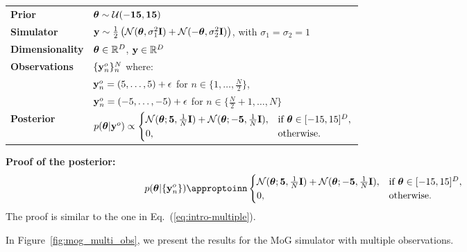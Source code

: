 \begin{tabular}{@{}ll@{}}
  \textbf{Prior} & $\boldsymbol{\theta} \sim \mathcal{U}(-\mathbf{15}, \mathbf{15})$ \\ [5pt]
  \textbf{Simulator} & $\mathbf{y} \sim \frac{1}{2} \left( \mathcal{N}(\boldsymbol{\theta}, \sigma_1^2 \mathbf{I}) + \mathcal{N}(-\boldsymbol{\theta}, \sigma_2^2 \mathbf{I}) \right)$, with $\sigma_1=\sigma_2=1$ \\ [5pt]
  \textbf{Dimensionality} & $\boldsymbol{\theta} \in \mathbb{R}^{D}$, $\mathbf{y} \in \mathbb{R}^{D}$ \\ [5pt]
  \textbf{Observations} & $\{\mathbf{y}^o_n\}_n^N$ where: \\ [5pt]
  & $\mathbf{y}^o_n = (5, \ldots, 5) + \epsilon$ for $n \in \{1, \ldots, \frac{N}{2}\}$, \\ [5pt] 
  & $\mathbf{y}^o_n = (-5, \ldots, -5) + \epsilon$ for $n \in \{\frac{N}{2}+1, \ldots, N\}$ \\ [5pt]
  \textbf{Posterior} & $ p(\boldsymbol{\theta} | \mathbf{y}^o) \propto
                                    \begin{cases}
                                      \mathcal{N}(\boldsymbol{\theta}; \mathbf{5}, \frac{1}{N} \mathbf{I}) + \mathcal{N}(\boldsymbol{\theta}; -\mathbf{5}, \frac{1}{N} \mathbf{I}), & \text{if } \boldsymbol{\theta} \in [-15, 15]^D, \\
                                      0, & \text{otherwise}.
                                    \end{cases} $ \\ [5pt]
\end{tabular}

\textbf{Proof of the posterior:}
\begin{equation}
  p(\thb|\{\data_n\}) \appropto 
  \begin{cases}
    \mathcal{N}(\thb; \mathbf{5}, \frac{1}{N} \mathbf{I}) + \mathcal{N}(\thb; -\mathbf{5}, \frac{1}{N}\mathbf{I}), & \text{if } \thb \in [-15, 15]^D, \\
    0, & \text{otherwise}.
  \end{cases}
  \label{eq:mog_mog_mult_obs}
\end{equation}
The proof is similar to the one in Eq.~(\ref{eq:intro-multiple}).

In Figure~\ref{fig:mog_multi_obs}, we present the results for the MoG simulator with multiple observations.


